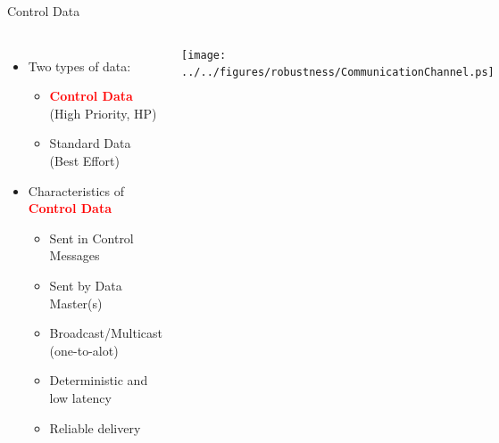\documentclass[compress,red]{beamer}
\begin{document}
\begin{frame}{Control Data}

\begin{columns}[c]
    \begin{itemize}
      \item Two types of data:
	  \begin{itemize}
	    \item \textcolor{red}{\bf Control Data} (High Priority, HP)
	    \item Standard Data (Best Effort)
	  \end{itemize}
	  \item Characteristics of \textcolor{red}{\bf Control Data}
	  \begin{itemize}
	    \item Sent in Control Messages
	    \item Sent by Data Master(s)
	    \item Broadcast/Multicast (one-to-alot)
	    \item Deterministic and low latency
	    \item Reliable delivery
	  \end{itemize}
    \end{itemize}
    \begin{center}
    \texttt{[image: ../../figures/robustness/CommunicationChannel.ps]}
    \end{center}

\end{columns}

\end{frame}
\end{document}
